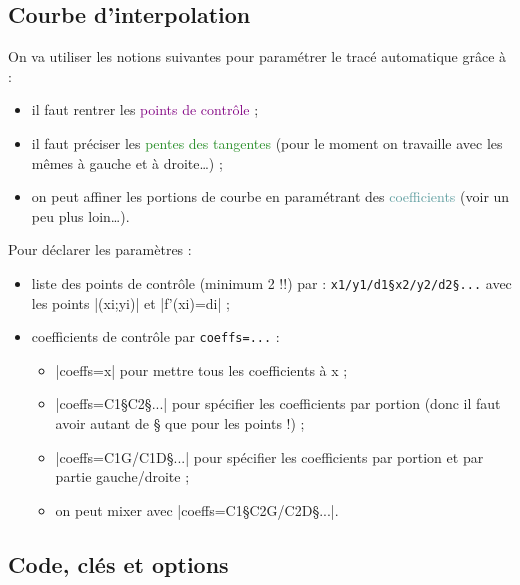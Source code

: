 \documentclass[a4paper,french,11pt]{article}
\newcommand\ctex[1]{\tcbox[vignettelatex]{#1}}
\begin{document}
\subsection{Courbe d'interpolation}

\begin{codeinfo}
On va utiliser les notions suivantes pour paramétrer le tracé \og automatique \fg{} grâce à  \ctex{..controls} :
%
\begin{itemize}
	\item il faut rentrer les \textcolor{purple}{\textsf{points de contrôle}} ;
	\item il faut préciser les \textcolor{ForestGreen}{\textsf{pentes des tangentes}} (pour le moment on travaille avec les mêmes à gauche et à droite\ldots) ;
	\item on peut \og affiner \fg{} les portions de courbe en paramétrant des \textcolor{CadetBlue}{\textsf{coefficients}} (voir un peu plus loin\ldots).
\end{itemize}

\medskip

Pour déclarer les paramètres :
%
\begin{itemize}
	\item liste des points de contrôle (minimum 2 !!) par : \verb|x1/y1/d1§x2/y2/d2§...| avec les points \pverb|(xi;yi)| et \vverb|f'(xi)=di| ;
	\item coefficients de contrôle par \verb|coeffs=...| :
	\begin{itemize}
		\item \averb|coeffs=x| pour mettre tous les coefficients à x ;
		\item \averb|coeffs=C1§C2§...| pour spécifier les coefficients par portion (donc il faut avoir autant de § que pour les points !) ;
		\item \averb|coeffs=C1G/C1D§...| pour spécifier les coefficients par portion et par partie gauche/droite ;
		\item on peut mixer avec \averb|coeffs=C1§C2G/C2D§...|.
	\end{itemize}
\end{itemize}
\end{codeinfo}

\subsection{Code, clés et options}

\begin{codetex}
\end{codetex}
\end{document}
